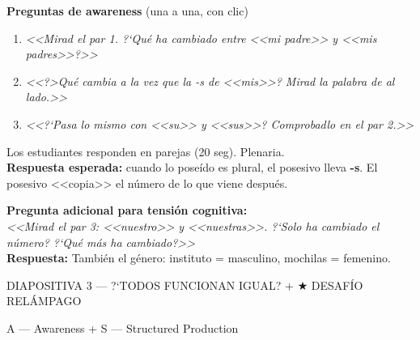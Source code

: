 \documentclass[a4paper,10pt]{article}
\begin{document}
\begin{awarenessbox}
\textbf{\textcolor{purpura}{Preguntas de awareness}} (una a una, con clic)

\begin{enumerate}[leftmargin=1.5em, itemsep=0.3cm]
\item \textit{<<Mirad el par 1. ?`Qu\'e ha cambiado entre <<mi padre>> y <<mis padres>>?>>}
\item \textit{<<?>Qu\'e cambia a la vez que la -s de <<mis>>? Mirad la palabra de al lado.>>}
\item \textit{<<?`Pasa lo mismo con <<su>> y <<sus>>? Comprobadlo en el par 2.>>}
\end{enumerate}

\vspace{0.2cm}

Los estudiantes responden en parejas (20 seg). Plenaria.\\
\textbf{Respuesta esperada:} cuando lo pose\'ido es plural, el posesivo lleva \textbf{-s}. El posesivo <<copia>> el n\'umero de lo que viene despu\'es.
\end{awarenessbox}

\vspace{0.4cm}

\begin{awarenessbox}
\textbf{\textcolor{purpura}{Pregunta adicional para tensi\'on cognitiva:}}\\[0.2cm]
\textit{<<Mirad el par 3: <<nuestro>> y <<nuestras>>. ?`Solo ha cambiado el n\'umero? ?`Qu\'e m\'as ha cambiado?>>}\\[0.2cm]
\textbf{Respuesta:} Tambi\'en el g\'enero: instituto = masculino, mochilas = femenino.
\end{awarenessbox}

\newpage


\begin{diapoheader}{DIAPOSITIVA 3 --- ?`TODOS FUNCIONAN IGUAL? + \textnormal{\Large$\bigstar$} DESAF\'IO REL\'AMPAGO}
\end{diapoheader}

\vspace{0.3cm}

\begin{marsfase}{A --- Awareness + S --- Structured Production}
\end{marsfase}
\end{document}
